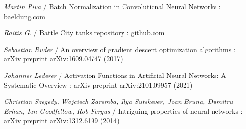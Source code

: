\documentclass[14pt,a4paper]{extarticle}
\newcounter{e}
\numberwithin{equation}{section}
\numberwithin{figure}{section}
\begin{document}
\begin{thebibliography}{99}
    \textit{Martin Riva} /
    Batch Normalization in Convolutional Neural Networks :
    \href{https://www.baeldung.com/cs/batch-normalization-cnn}{baeldung.com}

    \textit{Raitis G.} /
    Battle City tanks repository :
    \href{https://github.com/raitisg/battle-city-tanks}{github.com}

    \textit{Sebastian Ruder} /
    An overview of gradient descent optimization algorithms :
    arXiv preprint arXiv:1609.04747 (2017)

    \textit{Johannes Lederer} /
    Activation Functions in Artificial Neural Networks: A Systematic Overview :
    arXiv preprint arXiv:2101.09957 (2021)

    \textit{Christian Szegedy, Wojciech Zaremba, Ilya Sutskever, Joan Bruna, Dumitru Erhan, Ian Goodfellow, Rob Fergus} /
    Intriguing properties of neural networks :
    arXiv preprint arXiv:1312.6199 (2014)

\end{thebibliography}
\end{document}
